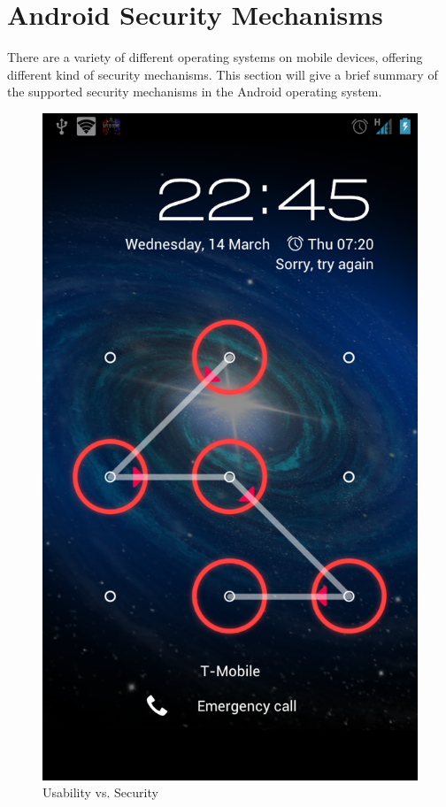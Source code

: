   \section{Android Security Mechanisms}

    There are a variety of different operating systems on mobile devices, offering different kind of security mechanisms. This section will give a brief summary of the supported security mechanisms in the Android operating system.

    \begin{figure}
      \vspace{-20pt}
      \begin{center}
        \includegraphics[scale=0.15]{pics/patternLock.png}
      \end{center}
      \vspace{-5pt}
      \caption{Usability vs. Security}
      \vspace{-10pt}
    \end{figure}
    
